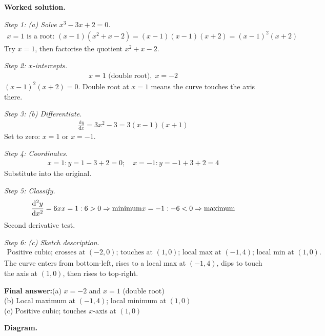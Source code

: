 \documentclass[11pt]{article}
\begin{document}
\textbf{Worked solution.}

\textit{Step 1: (a) Solve \( x^3 - 3x + 2 = 0 \).}
\[\begin{gathered}
x = 1 \text{ is a root: } (x-1)(x^2 + x - 2) = (x-1)(x-1)(x+2) = (x-1)^2(x+2)
\end{gathered}\]
Try \( x = 1 \), then factorise the quotient \( x^2 + x - 2 \).

\textit{Step 2: \( x \)-intercepts.}
\[\begin{gathered}
x = 1 \text{ (double root)}, \; x = -2
\end{gathered}\]
\( (x-1)^2(x+2)=0 \). Double root at \(x=1\) means the curve touches the axis there.

\textit{Step 3: (b) Differentiate.}
\[\begin{gathered}
\frac{\mathrm{d}y}{\mathrm{d}x} = 3x^2 - 3 = 3(x-1)(x+1)
\end{gathered}\]
Set to zero: \( x = 1 \) or \( x = -1 \).

\textit{Step 4: Coordinates.}
\[\begin{gathered}
x=1: y = 1-3+2=0; \quad x=-1: y = -1+3+2=4
\end{gathered}\]
Substitute into the original.

\textit{Step 5: Classify.}
\[\begin{gathered}
\frac{\mathrm{d}^2y}{\mathrm{d}x^2} = 6x \newline x=1: 6>0 \Rightarrow \text{minimum} \newline x=-1: -6<0 \Rightarrow \text{maximum}
\end{gathered}\]
Second derivative test.

\textit{Step 6: (c) Sketch description.}
\[\begin{gathered}
\text{Positive cubic; crosses at }(-2,0)\text{; touches at }(1,0)\text{; local max at }(-1,4)\text{; local min at }(1,0).
\end{gathered}\]
The curve enters from bottom-left, rises to a local max at \((-1,4)\), dips to touch the axis at \((1,0)\), then rises to top-right.

\begin{answerbox}
\textbf{Final answer:}\quad (a) \(\displaystyle  x = -2 \) and \(\displaystyle  x = 1 \) (double root) \\[3pt]  (b) Local maximum at \(\displaystyle  (-1, 4) \); local minimum at \(\displaystyle  (1, 0) \) \\[3pt]  (c) Positive cubic; touches \(\displaystyle  x \)-axis at \(\displaystyle  (1,0) \)
\end{answerbox}
\textbf{Diagram.}
\end{document}

